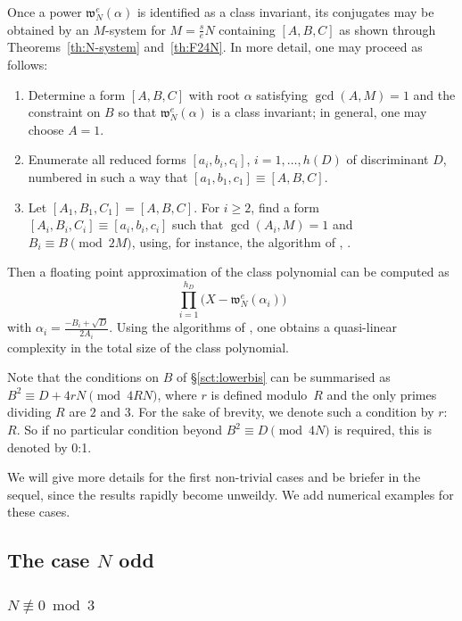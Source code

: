 \documentclass[12pt,twoside,leqno]{article}
\numberwithin{equation}{section}
\renewcommand{\geq}{\geqslant}
\newcommand{\w}{\mathfrak w}
\begin{document}
Once a power $\w_N^e (\alpha)$ is identified as a class invariant,
its conjugates may be obtained by an $M$-system for $M = \frac {s}{e} N$
containing $[A, B, C]$ as shown through Theorems~\ref {th:N-system}
and~\ref {th:F24N}. In more detail, one may proceed as follows:
\begin {enumerate}
\item
Determine a form $[A, B, C]$ with root $\alpha$ satisfying
$\gcd (A, M) = 1$ and the constraint on $B$ so that
$\w_N^e (\alpha)$ is a class invariant; in general, one may
choose $A = 1$.
\item
Enumerate all reduced forms $[a_i, b_i, c_i]$, $i = 1, \ldots, h (D)$
of discriminant $D$, numbered in such a way that
$[a_1, b_1, c_1] \equiv [A, B, C]$.
\item
Let $[A_1, B_1, C_1] = [A, B, C]$.
For $i \geq 2$, find a form $[A_i, B_i, C_i] \equiv [a_i, b_i, c_i]$
such that $\gcd (A_i, M) = 1$ and $B_i \equiv B \pmod {2 M}$, using,
for instance, the algorithm of \cite[Prop.~3]{Schertz02},
\cite[Th.~3.1.10]{Schertz09}.
\end {enumerate}
Then a floating point approximation of the class polynomial can be
computed as
\[
\prod_{i = 1}^{h_D} \big( X - \w_N^e (\alpha_i) \big)
\]
with $\alpha_i = \frac {- B_i + \sqrt D}{2 A_i}$.
Using the algorithms of \cite{Enge09}, one obtains a quasi-linear
complexity in the total size of the class polynomial.

Note that the conditions on $B$ of \S\ref {sct:lowerbis} can be
summarised as $B^2 \equiv D + 4 r N \pmod {4 R N}$, where $r$ is
defined modulo~$R$ and the only primes dividing $R$ are $2$ and $3$.
For the sake of brevity, we denote such a
condition by $r$:$R$. So if no particular condition
beyond $B^2 \equiv D \pmod {4 N}$ is required, this is denoted by
0:1.

We will give more details for the first non-trivial cases and be
briefer in the sequel, since the results rapidly become unweildy. We
add numerical examples for these cases.


\subsection{The case \texorpdfstring {$N$}{N} odd}
\label {sct:Nodd}

\subsubsection{\texorpdfstring {$N\not\equiv 0\bmod 3$}{N!=0 mod 3}}
\end{document}
